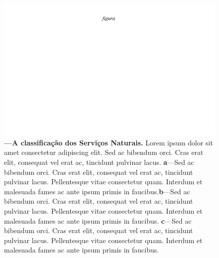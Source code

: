 \documentclass[./main.tex]{subfiles}
\begin{document}
\begin{figure}[t!] 
\centering				
\includegraphics[width=0.98\linewidth]{figs/fig_m.jpg}		
\caption[A classificação dos Serviços Naturais]
{\textbf{---\;A classificação dos Serviços Naturais.}
    Lorem ipsum dolor sit amet consectetur adipiscing elit. Sed ac bibendum orci. Cras erat elit, consequat vel erat ac, tincidunt pulvinar lacus. \;\textbf{a}\;---\;Sed ac bibendum orci. Cras erat elit, consequat vel erat ac, tincidunt pulvinar lacus. Pellentesque vitae consectetur quam. Interdum et malesuada fames ac ante ipsum primis in faucibus.\;\textbf{b}\;---\;Sed ac bibendum orci. Cras erat elit, consequat vel erat ac, tincidunt pulvinar lacus. Pellentesque vitae consectetur quam. Interdum et malesuada fames ac ante ipsum primis in faucibus. \;\textbf{c}\;---\;Sed ac bibendum orci. Cras erat elit, consequat vel erat ac, tincidunt pulvinar lacus. Pellentesque vitae consectetur quam. Interdum et malesuada fames ac ante ipsum primis in faucibus.
}
\label{fig:eco:natserv:sist} 		
\end{figure}
\end{document}
